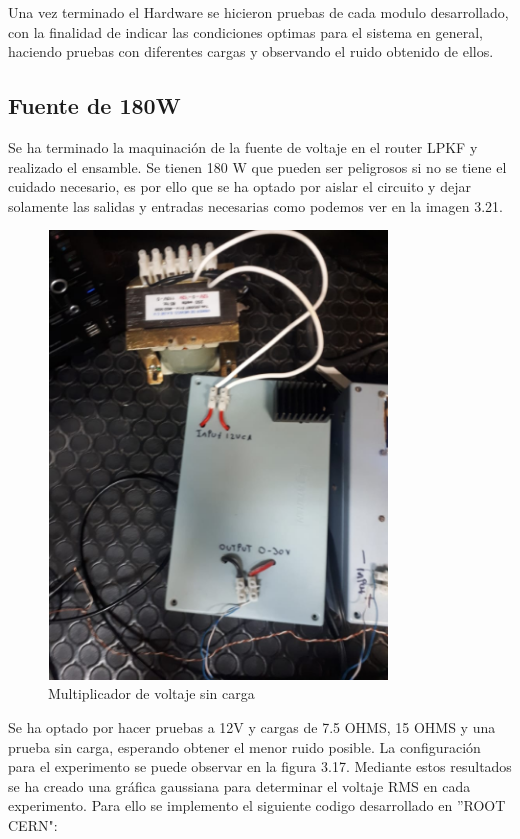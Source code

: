 Una vez terminado el Hardware se hicieron pruebas de cada modulo desarrollado, con la finalidad de indicar las condiciones optimas para el sistema en general, haciendo pruebas con diferentes cargas y observando el ruido obtenido de ellos. 

\subsection{Fuente de 180W}

Se ha terminado la maquinación de la fuente de voltaje en el router LPKF y realizado el ensamble. Se tienen 180 W que pueden ser peligrosos si no se tiene el cuidado necesario, es por ello que se ha optado por aislar el circuito y dejar solamente las salidas y entradas necesarias como podemos ver en la imagen 3.21.

\begin{figure}[H]
\centering
\includegraphics[width=9cm]{Capitulo3/figs/fotofuente.png}
\caption{Multiplicador de voltaje sin carga}
\end{figure}

Se ha optado por hacer pruebas a 12V y cargas de 7.5 OHMS, 15 OHMS y una prueba sin carga, esperando obtener el menor ruido posible. La configuración para el experimento se puede observar en la figura 3.17. Mediante estos resultados se ha creado una gráfica gaussiana para determinar el voltaje RMS en cada experimento. Para ello se implemento el siguiente codigo desarrollado en ''ROOT CERN":\\

